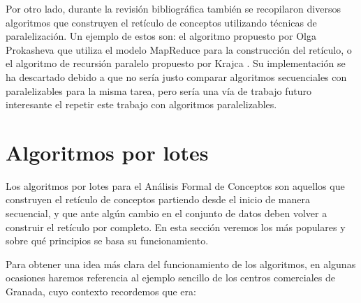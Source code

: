 \documentclass[oneside,openright,titlepage,numbers=noenddot,openany,headinclude,footinclude=true,
cleardoublepage=empty,abstractoff,BCOR=5mm,paper=a4,fontsize=12pt,main=spanish]{scrreprt}
\begin{document}
Por otro lado, durante la revisión bibliográfica también se recopilaron diversos algoritmos que construyen el retículo de conceptos utilizando técnicas de paralelización. Un ejemplo de estos son:  el algoritmo propuesto por Olga Prokasheva \cite{mapreduce} que utiliza el modelo MapReduce para la construcción del retículo, o el algoritmo de recursión paralelo propuesto por Krajca \cite{paralel}. Su implementación se ha descartado debido a que no sería justo comparar algoritmos secuenciales con paralelizables para la misma tarea, pero sería una vía de trabajo futuro interesante el repetir este trabajo con algoritmos paralelizables.

\section{Algoritmos por lotes}


Los algoritmos por lotes para el Análisis Formal de Conceptos son aquellos que construyen el retículo de conceptos partiendo desde el inicio de manera secuencial, y que ante algún cambio en el conjunto de datos deben volver a construir el retículo por completo. En esta sección veremos los más populares y sobre qué principios se basa su funcionamiento.

Para obtener una idea más clara del funcionamiento de los algoritmos, en algunas ocasiones haremos referencia al ejemplo sencillo de los centros comerciales de Granada, cuyo contexto recordemos que era:

\begin{table}[H]
\centering
{}
\caption{Tabla cruzada para un contexto de centros comerciales de Granada.}
\label{tab:comcercialesal}
\end{table}
\end{document}

